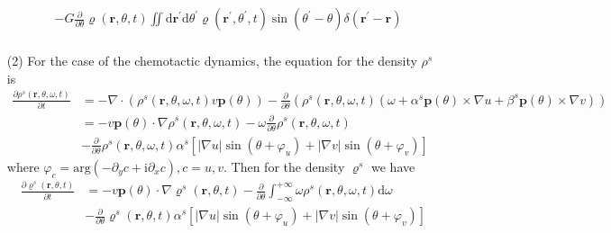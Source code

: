 \documentclass{article}
\begin{document}
\begin{enumerate}
\begin{equation}
\begin{aligned}
            &-G\frac{\partial}{\partial \theta}\varrho \left( \mathbf{r},\theta ,t \right) \iint{\mathrm{d}\mathbf{r}^{\prime}\mathrm{d}\theta^{\prime}\varrho \left( \mathbf{r}^{\prime},\theta^{\prime},t \right) \sin \left( \theta^{\prime}-\theta \right) \delta \left( \mathbf{r}^{\prime}-\mathbf{r} \right)}\\
        \end{aligned}
    \end{equation}
    \item[(2)] For the case of the chemotactic dynamics, the equation for the density $\rho^s$ is
    \begin{equation}
        \begin{aligned}
            \frac{\partial \rho ^s\left( \mathbf{r},\theta ,\omega ,t \right)}{\partial t}&=-\nabla \cdot \left( \rho ^s\left( \mathbf{r},\theta ,\omega ,t \right) v\mathbf{p}\left( \theta \right) \right) -\frac{\partial}{\partial \theta}\left( \rho ^s\left( \mathbf{r},\theta ,\omega ,t \right) \left( \omega +\alpha ^s\mathbf{p}\left( \theta \right) \times \nabla u+\beta ^s\mathbf{p}\left( \theta \right) \times \nabla v \right) \right)\\
            &=-v\mathbf{p}\left( \theta \right) \cdot \nabla \rho ^s\left( \mathbf{r},\theta ,\omega ,t \right) -\omega \frac{\partial}{\partial \theta}\rho ^s\left( \mathbf{r},\theta ,\omega ,t \right)\\
            &-\frac{\partial}{\partial \theta}\rho ^s\left( \mathbf{r},\theta ,\omega ,t \right) \alpha ^s\left[ \left| \nabla u \right|\sin \left( \theta +\varphi _u \right) +\left| \nabla v \right|\sin \left( \theta +\varphi _v \right) \right]
        \end{aligned}
    \end{equation}
    where $\varphi _c=\mathrm{arg}\left( -\partial _yc+\mathrm{i}\partial _xc \right) , c=u, v$. Then for the density $\varrho ^s$ we have
    \begin{equation}
        \label{eq:coarseDensityChemotactic}
        \begin{aligned}
            \frac{\partial \varrho ^s\left( \mathbf{r},\theta ,t \right)}{\partial t}&=-v\mathbf{p}\left( \theta \right) \cdot \nabla \varrho ^s\left( \mathbf{r},\theta ,t \right) -\frac{\partial}{\partial \theta}\int_{-\infty}^{+\infty}{\omega \rho ^s\left( \mathbf{r},\theta ,\omega ,t \right) \mathrm{d}\omega}\\
            &-\frac{\partial}{\partial \theta}\varrho ^s\left( \mathbf{r},\theta ,t \right) \alpha ^s\left[ \left| \nabla u \right|\sin \left( \theta +\varphi _u \right) +\left| \nabla v \right|\sin \left( \theta +\varphi _v \right) \right]\\
        \end{aligned}
    \end{equation}
\end{enumerate}
\end{document}
